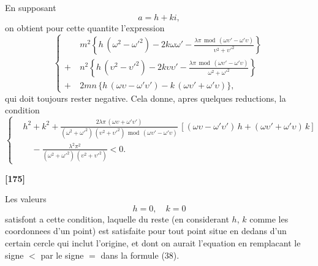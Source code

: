\documentclass[11pt,a4paper]{article}
\DeclareMathOperator{\modd}{mod}
\begin{document}
En supposant
\[a = h + ki,\]
on obtient pour cette quantite l'expression
\begin{equation}
\left\{
\begin{aligned}
&m^2 \left\{h\, (\omega^2 - \omega'^2) - 2k\omega\omega' - \frac{\lambda\pi\, \modd\, (\omega\upsilon' - \omega'\upsilon)}{\upsilon^2 + \upsilon'^2}\right\}\\
+\ &n^2 \left\{h\, (\upsilon^2 - \upsilon'^2) - 2k\upsilon\upsilon' - \frac{\lambda\pi\, \modd\, (\omega\upsilon' - \omega'\upsilon)}{\omega^2 + \omega'^2}\right\}\\
+\ &2mn\, \{h\, (\omega\upsilon - \omega'\upsilon') - k\, (\omega\upsilon' + \omega'\upsilon)\},
\end{aligned}
\right. \tag{37}
\end{equation}
qui doit toujours rester negative. Cela donne, apres quelques reductions, la condition
\begin{equation}
\left\{
\begin{aligned}
&h^2 + k^2 + \frac{2\lambda\pi\, (\omega\upsilon + \omega'\upsilon')}{(\omega^2 + \omega'^2)\, (\upsilon^2 + \upsilon'^2)\, \modd\, (\omega\upsilon' - \omega'\upsilon)}\, [(\omega\upsilon - \omega'\upsilon')\, h + (\omega\upsilon' + \omega'\upsilon)\, k]\\
&\quad - \frac{\lambda^2 \pi^2}{(\omega^2 + \omega'^2)\, (\upsilon^2 + \upsilon'^2)} < 0.
\end{aligned}
\right. \tag{38}
\end{equation}


\textbf{[175]}

Les valeurs
\[h = 0,\quad k = 0\]
satisfont a cette condition, laquelle du reste (en considerant $h$, $k$ comme les coordonnees
d'un point) est satisfaite pour tout point situe en dedans d'un certain cercle qui inclut
l'origine, et dont on aurait l'equation en remplacant le signe $<$ par le signe $=$ dans
la formule (38).
\end{document}
